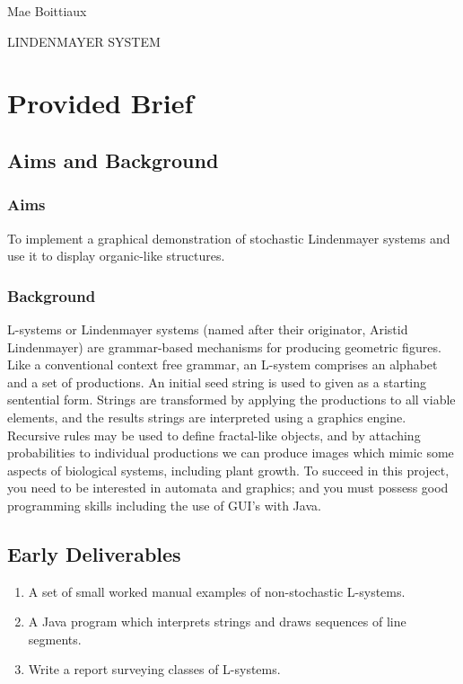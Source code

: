 \documentclass[11pt]{report}
\author{Hollie-Mae Boittiaux}
\begin{document}
\begin{titlepage}
    {\large Mae Boittiaux \par}
    {\huge LINDENMAYER SYSTEM \par}
\end{titlepage}

\tableofcontents

\chapter{Provided Brief}

\section{Aims and Background}

\subsection{Aims}
To implement a graphical demonstration of stochastic Lindenmayer systems and use it to
display organic-like structures.

\subsection{Background}
L-systems or Lindenmayer systems (named after their originator, Aristid Lindenmayer) are
grammar-based mechanisms for producing geometric figures. Like a conventional context
free grammar, an L-system comprises an alphabet and a set of productions. An initial seed
string is used to given as a starting sentential form. Strings are transformed by
applying the productions to all viable elements, and the results strings are interpreted
using a graphics engine.\newline
\newline
Recursive rules may be used to define fractal-like objects, and by attaching
probabilities to individual productions we can produce images which mimic some aspects of
biological systems, including plant growth.\newline
\newline
To succeed in this project, you need to be interested in automata and graphics; and you
must possess good programming skills including the use of GUI's with Java.

\section{Early Deliverables}
\begin{enumerate}
    \item A set of small worked manual examples of non-stochastic L-systems.
    \item A Java program which interprets strings and draws sequences of line segments.
    \item Write a report surveying classes of L-systems.
\end{enumerate}
\end{document}
